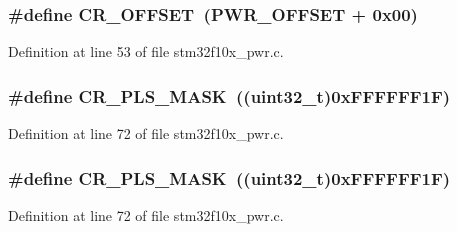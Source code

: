 \subsubsection[{\texorpdfstring{C\+R\+\_\+\+O\+F\+F\+S\+ET}{CR_OFFSET}}]{\setlength{\rightskip}{0pt plus 5cm}\#define C\+R\+\_\+\+O\+F\+F\+S\+ET~({\bf P\+W\+R\+\_\+\+O\+F\+F\+S\+ET} + 0x00)}\hypertarget{group___p_w_r___private___defines_gafa1d3d0ea72132df651c76fc1bdffffc}{}\label{group___p_w_r___private___defines_gafa1d3d0ea72132df651c76fc1bdffffc}


Definition at line 53 of file stm32f10x\+\_\+pwr.\+c.

\subsubsection[{\texorpdfstring{C\+R\+\_\+\+P\+L\+S\+\_\+\+M\+A\+SK}{CR_PLS_MASK}}]{\setlength{\rightskip}{0pt plus 5cm}\#define C\+R\+\_\+\+P\+L\+S\+\_\+\+M\+A\+SK~(({\bf uint32\+\_\+t})0x\+F\+F\+F\+F\+F\+F1\+F)}\hypertarget{group___p_w_r___private___defines_gac4a30eebdd1d292331a578b189962e77}{}\label{group___p_w_r___private___defines_gac4a30eebdd1d292331a578b189962e77}


Definition at line 72 of file stm32f10x\+\_\+pwr.\+c.

\subsubsection[{\texorpdfstring{C\+R\+\_\+\+P\+L\+S\+\_\+\+M\+A\+SK}{CR_PLS_MASK}}]{\setlength{\rightskip}{0pt plus 5cm}\#define C\+R\+\_\+\+P\+L\+S\+\_\+\+M\+A\+SK~(({\bf uint32\+\_\+t})0x\+F\+F\+F\+F\+F\+F1\+F)}\hypertarget{group___p_w_r___private___defines_gac4a30eebdd1d292331a578b189962e77}{}\label{group___p_w_r___private___defines_gac4a30eebdd1d292331a578b189962e77}


Definition at line 72 of file stm32f10x\+\_\+pwr.\+c.


